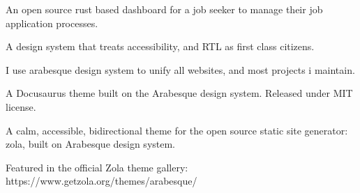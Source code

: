 
\begin{cvprojects}
	\begin{cvitems} %
		\item {
			An open source rust based dashboard for a job seeker to manage their job
			application processes.
		}
	\end{cvitems}

	\begin{cvitems} %
		\item {
			A design system that treats accessibility, and RTL as first class citizens.
		}
	\item {
			I use arabesque design system to unify all websites, and most projects i maintain.
		}
	\end{cvitems}

	\begin{cvitems} %
		\item {
				A Docusaurus theme built on the Arabesque design system. Released under
				MIT license.
		}
	\end{cvitems}

	\begin{cvitems} %
		\item {
				A calm, accessible, bidirectional theme for the open source static site
				generator: zola, built on Arabesque design system.
		}
		\item {
				Featured in the official Zola theme gallery: https://www.getzola.org/themes/arabesque/
		}
	\end{cvitems}


\end{cvprojects}
